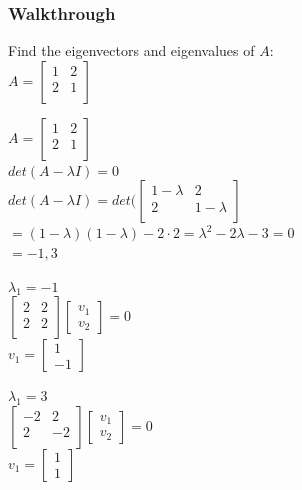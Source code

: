 \documentclass{beamer}
\begin{document}
\begin{frame}
\frametitle{Walkthrough}
Find the eigenvectors and eigenvalues of $A$: \\
\vspace{20pt}
\huge 
$A = 
    \begin{bmatrix}
    1 & 2\\
    2 & 1\\

    \end{bmatrix} $

\end{frame}

\begin{frame}

\huge
$A = 
    \begin{bmatrix}
    1 & 2\\
    2 & 1\\

    \end{bmatrix} $ \\
$det(A-\lambda I) = 0$ \\
$det(A-\lambda I) = det(\begin{bmatrix}
1 - \lambda & 2               \\
2                & 1 - \lambda \\
\end{bmatrix}$ \\
$ = (1-\lambda)(1-\lambda) - 2\cdot 2 = \lambda^2 - 2\lambda - 3 = 0$ \\
$ = -1, 3$

\end{frame}

\begin{frame}

\huge $\lambda_1 = -1$ \\
\large
$\begin{bmatrix}2 & 2\\2 & 2\\ \end{bmatrix} \begin{bmatrix} v_1 \\ v_2 \end{bmatrix} = 0$ \\
$v_1 = \begin{bmatrix}1 \\-1 \end{bmatrix}$ \\
\vspace{20pt}

\huge $\lambda_1 = 3$ \\
\large
$\begin{bmatrix}-2 & 2\\2 & -2\\ \end{bmatrix} \begin{bmatrix} v_1 \\ v_2 \end{bmatrix} = 0$ \\
$v_1 = \begin{bmatrix}1 \\1 \end{bmatrix}$

\end{frame}
\end{document}
